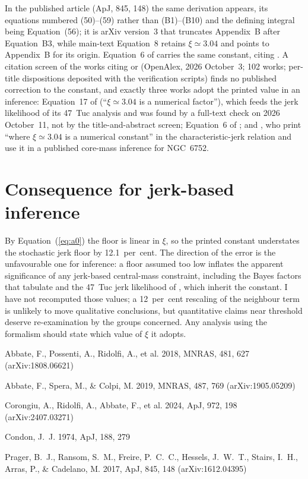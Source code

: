 \documentclass[twocolumn]{aastex701}
\begin{document}
In the published article (ApJ, 845, 148) the same derivation appears, its equations numbered (50)--(59) rather than (B1)--(B10) and the defining integral being Equation~(56); it is arXiv version~3 that truncates Appendix~B after Equation~B3, while main-text Equation~8 retains $\xi\simeq3.04$ and points to Appendix~B for its origin. Equation~6 of \citet{Abbate2019} carries the same constant, citing \citet{Prager2017}. A citation screen of the works citing \citet{Prager2017} or \citet{Abbate2019} (OpenAlex, 2026 October~3; 102 works; per-title dispositions deposited with the verification scripts) finds no published correction to the constant, and exactly three works adopt the printed value in an inference: Equation~17 of \citet{Abbate2018} (``$\xi\simeq3.04$ is a numerical factor''), which feeds the jerk likelihood of its 47~Tuc analysis and was found by a full-text check on 2026 October~11, not by the title-and-abstract screen; Equation~6 of \citet{Abbate2019}; and \citet{Corongiu2024}, who print ``where $\xi\simeq3.04$ is a numerical constant'' in the characteristic-jerk relation and use it in a published core-mass inference for NGC~6752.

\section{Consequence for jerk-based inference} \label{sec:conseq}

By Equation~(\ref{eq:a0}) the floor is linear in $\xi$, so the printed constant understates the stochastic jerk floor by 12.1~per~cent. The direction of the error is the unfavourable one for inference: a floor assumed too low inflates the apparent significance of any jerk-based central-mass constraint, including the Bayes factors that \citet{Abbate2019} tabulate and the 47~Tuc jerk likelihood of \citet{Abbate2018}, which inherit the constant. I have not recomputed those values; a 12~per~cent rescaling of the neighbour term is unlikely to move qualitative conclusions, but quantitative claims near threshold deserve re-examination by the groups concerned. Any analysis using the formalism should state which value of $\xi$ it adopts.


\begin{thebibliography}{}
Abbate, F., Possenti, A., Ridolfi, A., et al. 2018, MNRAS, 481, 627 (arXiv:1808.06621)

Abbate, F., Spera, M., \& Colpi, M. 2019, MNRAS, 487, 769 (arXiv:1905.05209)

Corongiu, A., Ridolfi, A., Abbate, F., et al. 2024, ApJ, 972, 198 (arXiv:2407.03271)

Condon, J.~J. 1974, ApJ, 188, 279

Prager, B.~J., Ransom, S.~M., Freire, P.~C.~C., Hessels, J.~W.~T., Stairs, I.~H., Arras, P., \& Cadelano, M. 2017, ApJ, 845, 148 (arXiv:1612.04395)

\end{thebibliography}
\end{document}
